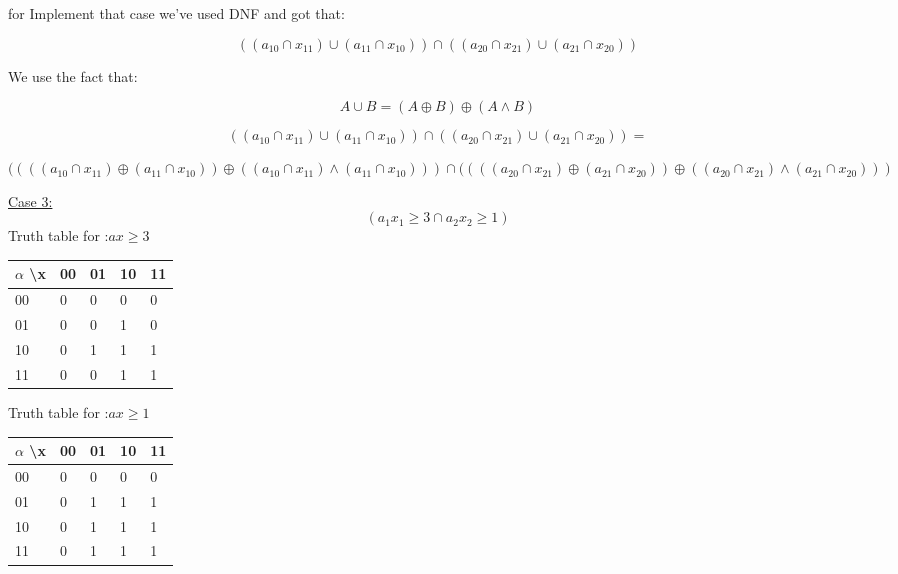 \documentclass[11pt]{article}
\begin{document}
for Implement that case we've used DNF and got that:

\begin{equation*}
((a_{10} \cap x_{11}) \cup (a_{11} \cap x_{10})) \cap ((a_{20} \cap x_{21}) \cup (a_{21} \cap x_{20})) 
\end{equation*}

 We use the fact that:
 
 \begin{equation*}
     A\cup B=(A\oplus B) \oplus (A\wedge B)
 \end{equation*}
 
 \begin{equation*}
 ((a_{10}\cap x_{11})\cup (a_{11}\cap x_{10})) \cap ((a_{20}\cap x_{21})\cup (a_{21}\cap x_{20}))= \end{equation*}
 

      $((((a_{10}\cap x_{11})\oplus (a_{11}\cap x_{10})) \oplus  ((a_{10}\cap x_{11})\wedge (a_{11}\cap x_{10})))\cap((((a_{20}\cap x_{21})\oplus (a_{21}\cap x_{20}))\oplus ((a_{20}\cap x_{21})\wedge (a_{21}\cap x_{20}))) $
      
      
 \underline{Case 3:}
 \begin{equation} ( a_1 x_1 \geq 3 \cap a_2 x_2 \geq 1)  \end{equation}
Truth table for :$ ax\geq 3 $  

\begin{table}[ht!]
\centering
\begin{tabular}{ | m{1cm} | m{.8cm} | m{.8cm} | m{.8cm}| m{.8cm} | } 
  \hline
  $\alpha$ \textbackslash  x & 00 & 01 & 10 & 11 \\ [1 ex] 
 \hline\hline
 00 & 0 & 0 & 0 & 0\\ 
 01 & 0 & 0 & 1 & 0\\
 10 & 0 & 1 & 1 & 1 \\
 11 & 0 & 0 & 1 & 1\\ [1ex] 
 \hline
\end{tabular}
\end{table}
Truth table for :$ ax\geq 1 $ 
\begin{table}[ht!]
\centering
\begin{tabular}{ | m{1cm} | m{.8cm} | m{.8cm} | m{.8cm}| m{.8cm} | } 
  \hline
  $\alpha$ \textbackslash  x & 00 & 01 & 10 & 11 \\ [1 ex] 
 \hline\hline
00 & 0 & 0 & 0 & 0\\ 
01 & 0 & 1 & 1 & 1\\
10 & 0 & 1 & 1 & 1 \\
11 & 0 & 1 & 1 & 1\\ [1ex] 
 \hline
\end{tabular}
\end{table}
\end{document}

